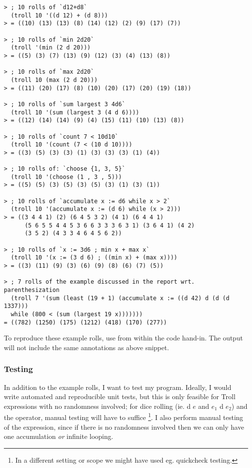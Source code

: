 \begin{verbatim}
> ; 10 rolls of `d12+d8`
  (troll 10 '((d 12) + (d 8)))
> = ((10) (13) (13) (8) (14) (12) (2) (9) (17) (7))

> ; 10 rolls of `min 2d20`
  (troll '(min (2 d 20)))
> = ((5) (3) (7) (13) (9) (12) (3) (4) (13) (8))

> ; 10 rolls of `max 2d20`
  (troll 10 (max (2 d 20)))
> = ((11) (20) (17) (8) (10) (20) (17) (20) (19) (18))

> ; 10 rolls of `sum largest 3 4d6`
  (troll 10 '(sum (largest 3 (4 d 6))))
> = ((12) (14) (14) (9) (4) (15) (11) (10) (13) (8))

> ; 10 rolls of `count 7 < 10d10`
  (troll 10 '(count (7 < (10 d 10))))
> = ((3) (5) (3) (3) (1) (3) (3) (3) (1) (4))

> ; 10 rolls of: `choose {1, 3, 5}`
  (troll 10 '(choose (1 , 3 , 5)))
> = ((5) (5) (3) (5) (3) (5) (3) (1) (3) (1))

> ; 10 rolls of `accumulate x := d6 while x > 2`
  (troll 10 '(accumulate x := (d 6) while (x > 2)))
> = ((3 4 4 1) (2) (6 4 5 3 2) (4 1) (6 4 4 1)
      (5 6 5 5 4 4 5 3 6 6 3 3 3 6 3 1) (3 6 4 1) (4 2)
      (3 5 2) (4 3 3 4 6 4 5 6 2))

> ; 10 rolls of `x := 3d6 ; min x + max x`
  (troll 10 '(x := (3 d 6) ; ((min x) + (max x))))
> = ((3) (11) (9) (3) (6) (9) (8) (6) (7) (5))

> ; 7 rolls of the example discussed in the report wrt. parenthesization
  (troll 7 '(sum (least (19 + 1) (accumulate x := ((d 42) d (d (d 1337)))
  while (800 < (sum (largest 19 x)))))))
= ((782) (1250) (175) (1212) (418) (170) (277))
\end{verbatim}

To reproduce these example rolls, use  from within the code
hand-in. The output will not include the same annotations as above snippet.


\newpage
\subsubsection{Testing}

In addition to the example rolls, I want to test my program. Ideally, I would
write automated and reproducible unit tests, but this is only feasible for Troll
expressions with no randomness involved; for dice rolling (ie. \ms d $e$ and
$e_1$ \ms d $e_2$) and the  operator, manual testing will have to
suffice \footnote{In a different setting or scope we might have used eg.
quickcheck testing.}. I also perform manual testing of the 
expression, since if there is no randomness involved then we can only have one
accumulation \emph{or} infinite looping.

